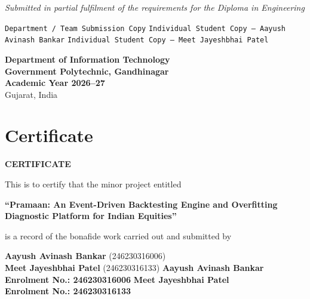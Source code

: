 \documentclass[12pt,a4paper,oneside]{report}
\newcommand{\copyMode}{0}
\begin{document}
\begin{titlepage}
\begin{center}
        \vspace{0.25cm}
        \normalsize\itshape
        Submitted in partial fulfilment of the requirements for the Diploma in Engineering

        \vspace{0.3cm}
        \normalsize
\ifcase\copyMode
        \texttt{Department / Team Submission Copy}
\or
        \texttt{Individual Student Copy --- Aayush Avinash Bankar}
\or
        \texttt{Individual Student Copy --- Meet Jayeshbhai Patel}
\fi

        \vfill
        \large
        \textbf{Department of Information Technology} \\
        \textbf{Government Polytechnic, Gandhinagar} \\
        \vspace{0.2cm}
        \textbf{Academic Year 2026--27} \\
        \normalsize
        Gujarat, India
    \end{center}
\end{titlepage}


\chapter*{Certificate}
\thispagestyle{plain}

\vspace{1cm}
\begin{center}
    \textbf{\large CERTIFICATE}
\end{center}
\vspace{0.8cm}

This is to certify that the minor project entitled

\begin{center}
    \textbf{\large ``Pramaan: An Event-Driven Backtesting Engine and Overfitting}\\
    \textbf{\large Diagnostic Platform for Indian Equities''}
\end{center}

is a record of the bonafide work carried out and submitted by

\begin{center}
\ifcase\copyMode
    \textbf{Aayush Avinash Bankar} (246230316006) \\
    \textbf{Meet Jayeshbhai Patel} (246230316133)
\or
    \textbf{\Large Aayush Avinash Bankar} \\
    \textbf{Enrolment No.: 246230316006}
\or
    \textbf{\Large Meet Jayeshbhai Patel} \\
    \textbf{Enrolment No.: 246230316133}
\fi
\end{center}
\end{document}
